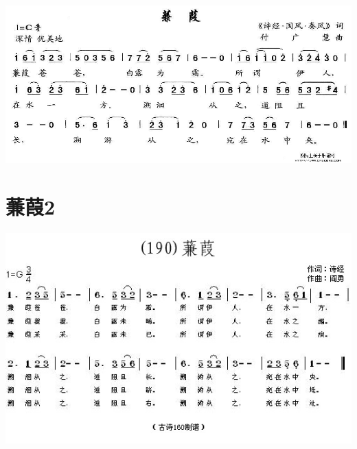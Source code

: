 \documentclass[cn,pad,twocol]{elegantbook}
\begin{document}
\section{}      \includegraphics[width=\textwidth]{rpi400/20210123-蒹葭.jpg}
\section{蒹葭2}     \includegraphics[width=\textwidth]{rpi400/20210123-蒹葭2.jpg}
\end{document}
